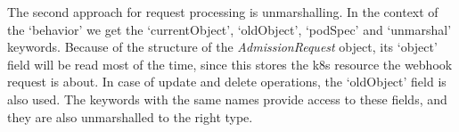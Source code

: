 The second approach for request processing is unmarshalling. In the context of the `behavior' we get the `currentObject', `oldObject', `podSpec' and `unmarshal' keywords. Because of the structure of the \emph{AdmissionRequest} object, its `object' field will be read most of the time, since this stores the k8s resource the webhook request is about. In case of update and delete operations, the `oldObject' field is also used. The keywords with the same names provide access to these fields, and they are also unmarshalled to the right type.



